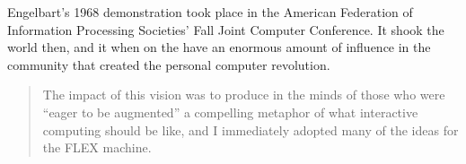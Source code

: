 Engelbart's 1968 demonstration took place in the American Federation of
Information Processing Societies' Fall Joint Computer Conference. It
shook the world then, and it when on the have an enormous amount of
influence in the community that created the personal computer
revolution. \cite{hypertext:muller__vision_and_reality}

\begin{quote}
  The impact of this vision was to produce in the minds of those who
  were ``eager to be augmented'' a compelling metaphor of what
  interactive computing should be like, and I immediately adopted many
  of the ideas for the FLEX machine. 
  \cite{smalltalk:kay_alan__early_history_smalltalk}
\end{quote}
